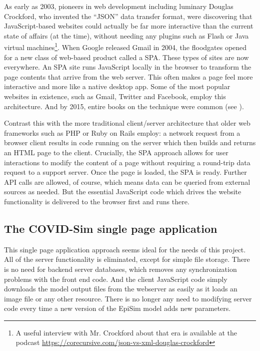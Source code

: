 As early as 2003, pioneers in web development including luminary Douglas Crockford, who invented the ``JSON'' data transfer format, were discovering that JavaScript-based websites could actually be far more interactive than the current state of affairs (at the time), without needing any plugins such as Flash or Java virtual machines\footnote{A useful interview with Mr. Crockford about that era is available at the podcast \url{https://corecursive.com/json-vs-xml-douglas-crockford}}. When Google released Gmail in 2004, the floodgates opened for a new class of web-based product called a \gls{SPA}. These types of sites are now everywhere. An SPA site runs JavaScript locally in the browser to transform the page contents that arrive from the web server. This often makes a page feel more interactive and more like a native desktop app. Some of the most popular websites in existence, such as Gmail, Twitter and Facebook, employ this architecture. And by 2015, entire books on the technique were common (see \cite{Scott2015spa}).

Contrast this with the more traditional client/server architecture that older web frameworks such as PHP or Ruby on Rails employ: a network request from a browser client results in code running on the server which then builds and returns an HTML page to the client. Crucially, the SPA approach allows for user interactions to modify the content of a page without requiring a round-trip data request to a support server. Once the page is loaded, the SPA is ready. Further API calls are allowed, of course, which means data can be queried from external sources as needed. But the essential JavaScript code which drives the website functionality is delivered to the browser first and runs there.

\hypertarget{covid-single-page-application}{%
\subsection{The COVID-Sim single page application}\label{covid-single-page-application}}

This single page application approach seems ideal for the needs of this project. All of the server functionality is eliminated, except for simple file storage. There is no need for backend server databases, which removes any synchronization problems with the front end code. And the client JavaScript code simply downloads the model output files from the webserver as easily as it loads an image file or any other resource. There is no longer any need to modifying server code every time a new version of the EpiSim model adds new parameters.

